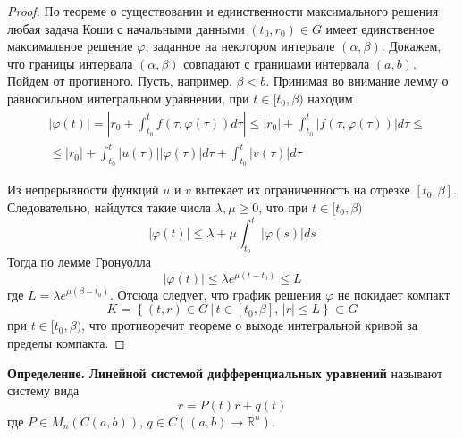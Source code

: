 \begin{proof}
    По теореме о существовании и единственности максимального решения любая задача Коши с начальными данными $(t_0, r_0) \in G$ имеет единственное максимальное решение $\varphi$, заданное на некотором интервале $(\alpha, \beta)$. Докажем, что границы интервала $(\alpha, \beta)$ совпадают с границами интервала $(a,b)$. Пойдем от противного. Пусть, например, $\beta < b$. Принимая во внимание лемму о равносильном интегральном уравнении, при $t \in [t_0, \beta)$ находим
    \begin{equation*}
        \begin{aligned}
             & |\varphi(t)| = \left|r_0 + \int_{t_0}^t f(\tau, \varphi(\tau))d\tau \right| \le |r_0| + \int_{t_0}^t |f(\tau, \varphi(\tau))|d\tau \le \\
             & \le |r_0| + \int_{t_0}^t |u(\tau)||\varphi(\tau)|d\tau + \int_{t_0}^t |v(\tau)|d\tau
        \end{aligned}
    \end{equation*}

    Из непрерывности функций $u$ и $v$ вытекает их ограниченность на отрезке $[t_0, \beta]$. Следовательно, найдутся такие числа $\lambda, \mu \ge 0$, что при $t \in [t_0, \beta)$
    \begin{equation*}
        |\varphi(t)| \le \lambda + \mu \int_{t_0}^t |\varphi(s)|ds
    \end{equation*}
    Тогда по лемме Гронуолла
    \begin{equation*}
        |\varphi(t)| \le \lambda e^{\mu (t - t_0)} \le L
    \end{equation*}
    где $L = \lambda e^{\mu (\beta - t_0)}$. Отсюда следует, что график решения $\varphi$ не покидает компакт
    \begin{equation*}
        K = \left\{(t,r) \in G\, |\, t \in [t_0, \beta],\, |r| \le L \right\} \subset G
    \end{equation*}
    при $t \in [t_0, \beta)$, что противоречит теореме о выходе интегральной кривой за пределы компакта.
\end{proof}

\noindent \textbf{Определение.} \textbf{Линейной системой дифференциальных уравнений} называют систему вида
\begin{equation}
    \dot{r} = P(t)r + q(t) \label{lnsu}
\end{equation}
где $P \in M_n(C(a,b))$, $q \in C((a,b) \to \mathbb{R}^n)$.\\


